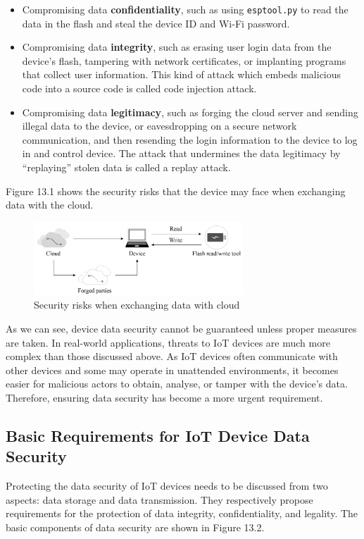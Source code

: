 \documentclass[a4paper,12pt,openany]{book}
\begin{document}
\begin{itemize}
    \item  Compromising data \textbf{confidentiality}, such as using \verb|esptool.py| to read the data in the flash and steal the device ID and Wi-Fi password.
    \item Compromising data \textbf{integrity}, such as erasing user login data from the device’s flash, tampering with network certificates, or implanting programs that collect user information. This kind of attack which embeds malicious code into a source code is called code injection attack.
    \item Compromising data \textbf{legitimacy}, such as forging the cloud server and sending illegal data to the device, or eavesdropping on a secure network communication, and then resending the login information to the device to log in and control device. The attack that undermines the data legitimacy by “replaying” stolen data is called a replay attack.
\end{itemize}

Figure 13.1 shows the security risks that the device may face when exchanging data with the cloud.

\begin{figure}[!h]
    \centering
    \includegraphics[width=0.7\textwidth]{D13Z/13-1}
    \caption{Security risks when exchanging data with cloud}
\end{figure}

As we can see, device data security cannot be guaranteed unless proper measures are taken. In real-world applications, threats to IoT devices are much more complex than those discussed above. As IoT devices often communicate with other devices and some may operate in unattended environments, it becomes easier for malicious actors to obtain, analyse, or tamper with the device's data. Therefore, ensuring data security has become a more urgent requirement.

\subsection{Basic Requirements for IoT Device Data Security}
Protecting the data security of IoT devices needs to be discussed from two aspects: data storage and data transmission. They respectively propose requirements for the protection of data integrity, confidentiality, and legality. The basic components of data security are shown in Figure 13.2.
\end{document}
